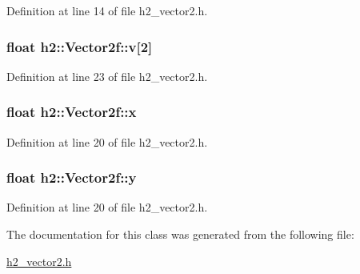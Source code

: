 Definition at line 14 of file h2\-\_\-vector2.\-h.

\hypertarget{classh2_1_1_vector2f_a0a3245e21b0f085c337587457de201de}{
\subsubsection[{v}]{\setlength{\rightskip}{0pt plus 5cm}float h2\-::\-Vector2f\-::v\mbox{[}2\mbox{]}}}\label{classh2_1_1_vector2f_a0a3245e21b0f085c337587457de201de}


Definition at line 23 of file h2\-\_\-vector2.\-h.

\hypertarget{classh2_1_1_vector2f_a39a782153c3a3b1bcec9803a609a96fb}{
\subsubsection[{x}]{\setlength{\rightskip}{0pt plus 5cm}float h2\-::\-Vector2f\-::x}}\label{classh2_1_1_vector2f_a39a782153c3a3b1bcec9803a609a96fb}


Definition at line 20 of file h2\-\_\-vector2.\-h.

\hypertarget{classh2_1_1_vector2f_ae38b4f697aa2273f1b5b4adf04ac949e}{
\subsubsection[{y}]{\setlength{\rightskip}{0pt plus 5cm}float h2\-::\-Vector2f\-::y}}\label{classh2_1_1_vector2f_ae38b4f697aa2273f1b5b4adf04ac949e}


Definition at line 20 of file h2\-\_\-vector2.\-h.



The documentation for this class was generated from the following file\-:\begin{DoxyCompactItemize}
\item 
\hyperlink{h2__vector2_8h}{h2\-\_\-vector2.\-h}\end{DoxyCompactItemize}
